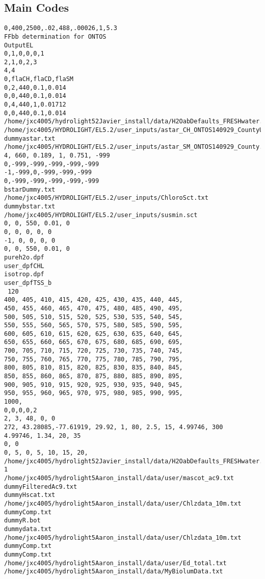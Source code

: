 \begin{appendices}
\chapter{Main Codes}


\singlespacing
{}
\renewcommand{\lstlistingname}{Code}
\begin{lstlisting}
0,400,2500,.02,488,.00026,1,5.3
FFbb determination for ONTOS
OutputEL
0,1,0,0,0,1
2,1,0,2,3
4,4
0,flaCH,flaCD,flaSM
0,2,440,0.1,0.014
0,0,440,0.1,0.014
0,4,440,1,0.01712
0,0,440,0.1,0.014
/home/jxc4005/hydrolight52Javier_install/data/H2OabDefaults_FRESHwater.txt
/home/jxc4005/HYDROLIGHT/EL5.2/user_inputs/astar_CH_ONTOS140929_CountyUncorr.txt
dummyastar.txt
/home/jxc4005/HYDROLIGHT/EL5.2/user_inputs/astar_SM_ONTOS140929_County.txt
4, 660, 0.189, 1, 0.751, -999
0,-999,-999,-999,-999,-999
-1,-999,0,-999,-999,-999
0,-999,-999,-999,-999,-999
bstarDummy.txt
/home/jxc4005/HYDROLIGHT/EL5.2/user_inputs/ChloroSct.txt
dummybstar.txt
/home/jxc4005/HYDROLIGHT/EL5.2/user_inputs/susmin.sct
0, 0, 550, 0.01, 0
0, 0, 0, 0, 0
-1, 0, 0, 0, 0
0, 0, 550, 0.01, 0
pureh2o.dpf
user_dpfCHL
isotrop.dpf
user_dpfTSS_b
 120
400, 405, 410, 415, 420, 425, 430, 435, 440, 445,
450, 455, 460, 465, 470, 475, 480, 485, 490, 495,
500, 505, 510, 515, 520, 525, 530, 535, 540, 545,
550, 555, 560, 565, 570, 575, 580, 585, 590, 595,
600, 605, 610, 615, 620, 625, 630, 635, 640, 645,
650, 655, 660, 665, 670, 675, 680, 685, 690, 695,
700, 705, 710, 715, 720, 725, 730, 735, 740, 745,
750, 755, 760, 765, 770, 775, 780, 785, 790, 795,
800, 805, 810, 815, 820, 825, 830, 835, 840, 845,
850, 855, 860, 865, 870, 875, 880, 885, 890, 895,
900, 905, 910, 915, 920, 925, 930, 935, 940, 945,
950, 955, 960, 965, 970, 975, 980, 985, 990, 995,
1000,
0,0,0,0,2
2, 3, 48, 0, 0
272, 43.28085,-77.61919, 29.92, 1, 80, 2.5, 15, 4.99746, 300
4.99746, 1.34, 20, 35
0, 0
0, 5, 0, 5, 10, 15, 20, 
/home/jxc4005/hydrolight52Javier_install/data/H2OabDefaults_FRESHwater.txt
1
/home/jxc4005/hydrolight5Aaron_install/data/user/mascot_ac9.txt
dummyFilteredAc9.txt
dummyHscat.txt
/home/jxc4005/hydrolight5Aaron_install/data/user/Chlzdata_10m.txt
dummyComp.txt
dummyR.bot
dummydata.txt
/home/jxc4005/hydrolight5Aaron_install/data/user/Chlzdata_10m.txt
dummyComp.txt
dummyComp.txt
/home/jxc4005/hydrolight5Aaron_install/data/user/Ed_total.txt
/home/jxc4005/hydrolight5Aaron_install/data/MyBiolumData.txt
\end{lstlisting}

\end{appendices}
